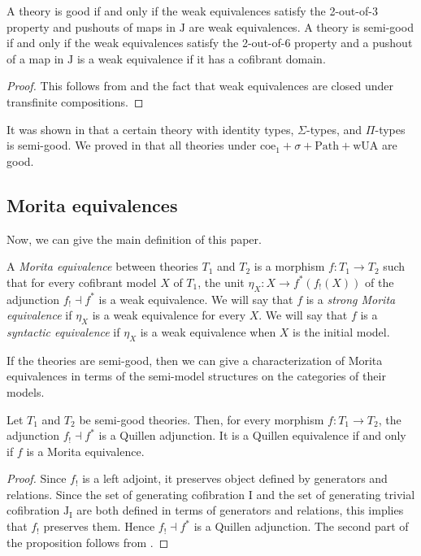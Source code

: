 \documentclass[reqno]{amsart}
\theoremstyle{definition}
\theoremstyle{remark}
\newcommand{\wUA}{\mathrm{wUA}}
\newcommand{\coeT}{\mathrm{coe}}
\newcommand{\PathT}{\mathrm{Path}}
\newcommand{\I}{\mathrm{I}}
\newcommand{\J}{\mathrm{J}}
\numberwithin{figure}{section}
\begin{document}
\begin{prop}
A theory is good if and only if the weak equivalences satisfy the 2-out-of-3 property and pushouts of maps in $\J$ are weak equivalences.
A theory is semi-good if and only if the weak equivalences satisfy the 2-out-of-6 property and a pushout of a map in $\J$ is a weak equivalence if it has a cofibrant domain.
\end{prop}
\begin{proof}
This follows from \cite[Proposition~3.1]{f-model-structures} and the fact that weak equivalences are closed under transfinite compositions.
\end{proof}

It was shown in \cite{kap-lum-model} that a certain theory with identity types, $\Sigma$-types, and $\Pi$-types is semi-good.
We proved in \cite{alg-models} that all theories under $\coeT_1 + \sigma + \PathT + \wUA$ are good.

\subsection{Morita equivalences}

Now, we can give the main definition of this paper.

\begin{defn}
A \emph{Morita equivalence} between theories $T_1$ and $T_2$ is a morphism $f : T_1 \to T_2$ such that for every cofibrant model $X$ of $T_1$,
the unit $\eta_X : X \to f^*(f_!(X))$ of the adjunction $f_! \dashv f^*$ is a weak equivalence.
We will say that $f$ is a \emph{strong Morita equivalence} if $\eta_X$ is a weak equivalence for every $X$.
We will say that $f$ is a \emph{syntactic equivalence} if $\eta_X$ is a weak equivalence when $X$ is the initial model.
\end{defn}

If the theories are semi-good, then we can give a characterization of Morita equivalences in terms of the semi-model structures on the categories of their models.

\begin{prop}
Let $T_1$ and $T_2$ be semi-good theories.
Then, for every morphism $f : T_1 \to T_2$, the adjunction $f_! \dashv f^*$ is a Quillen adjunction.
It is a Quillen equivalence if and only if $f$ is a Morita equivalence.
\end{prop}
\begin{proof}
Since $f_!$ is a left adjoint, it preserves object defined by generators and relations.
Since the set of generating cofibration $\I$ and the set of generating trivial cofibration $\J_\I$
are both defined in terms of generators and relations, this implies that $f_!$ preserves them.
Hence $f_! \dashv f^*$ is a Quillen adjunction.
The second part of the proposition follows from \cite[Corollary~3.9]{f-model-structures}.
\end{proof}
\end{document}
